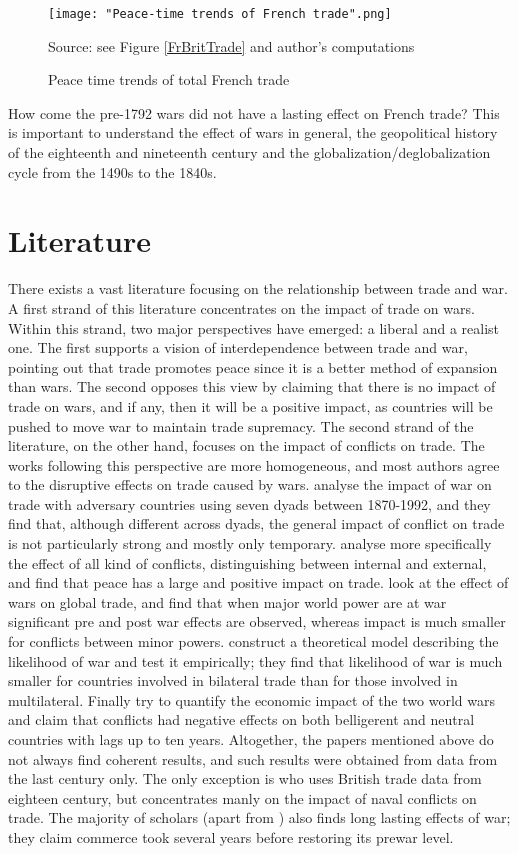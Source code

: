 \documentclass[12pt,a4paper,notitlepage,english]{article}
\newcommand{\source}[1]{\caption*{\footnotesize Source: {#1}} }
\begin{document}
\begin{figure}
\caption{Peace time trends of total French trade}
\centering
\texttt{[image: "Peace-time trends of French trade".png]}
\source{see Figure \ref{FrBritTrade} and author's computations}
\label{FrPeaceTrade}
\end{figure}
How come the pre-1792 wars did not have a lasting effect on French trade? This is important to understand the effect of wars in general, the geopolitical history of the eighteenth and nineteenth century and the globalization/deglobalization cycle from the 1490s to the 1840s.

\section{Literature}
There exists a vast literature focusing on the relationship between trade and war.
A first strand of this literature concentrates on the impact of trade on wars. Within this strand, two major perspectives have emerged: a liberal and a realist one. The first supports a vision of interdependence between trade and war, pointing out that trade promotes peace since it is a better method of expansion than wars. The second opposes this view by claiming that there is no impact of trade on wars, and if any, then it will be a positive impact, as countries will be pushed to move war to maintain trade supremacy.
The second strand of the literature, on the other hand, focuses on the impact of conflicts on trade. The works following this perspective are more homogeneous, and most authors agree to the disruptive effects on trade caused by wars. \cite{levy2004trading} analyse the impact of war on trade with adversary countries using seven dyads between 1870-1992, and they find that, although different across dyads, the general impact of conflict on trade is not particularly strong and mostly only temporary. \cite{blomberg2006much} analyse more specifically the effect of all kind of conflicts, distinguishing between internal and external, and find that peace has a large and positive impact on trade. \cite{anderton2001impact} look at the effect of wars on global trade, and find that when major world power are at war significant pre and post war effects are observed, whereas impact is much smaller for conflicts between minor powers. \cite{martin2008make} construct a theoretical model describing the likelihood of war and test it empirically; they find that likelihood of war is much smaller for countries involved in bilateral trade than for those involved in multilateral. Finally \cite{glick2010collateral} try to quantify the economic impact of the two world wars and claim that conflicts had negative effects on both belligerent and neutral countries with lags up to ten years. Altogether, the papers mentioned above do not always find coherent results, and such results were obtained from data from the last century only. The only exception is \cite{rahman2010fighting} who uses British trade data from eighteen century, but concentrates manly on the impact of naval conflicts on trade. The majority of scholars (apart from \cite{levy2004trading}) also finds long lasting effects of war; they claim commerce took several years before restoring its prewar level.\\
\end{document}
